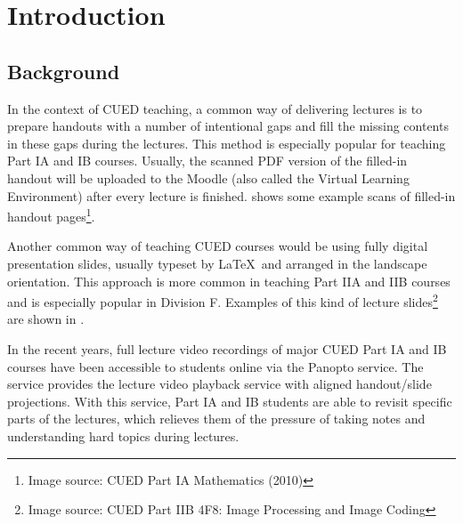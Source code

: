 
\chapter{Introduction}  %

\ifpdf
    \graphicspath{{Chapter1/Figs/Raster/}{Chapter1/Figs/PDF/}{Chapter1/Figs/}}
\else
    \graphicspath{{Chapter1/Figs/Vector/}{Chapter1/Figs/}}
\fi


\section{Background}
\label{sec:intro-background}

In the context of CUED teaching, a common way of delivering lectures is to prepare handouts with a number of intentional gaps and fill the missing contents in these gaps during the lectures. This method is especially popular for teaching Part IA and IB courses. Usually, the scanned PDF version of the filled-in handout will be uploaded to the Moodle (also called the Virtual Learning Environment) after every lecture is finished.  shows some example scans of filled-in handout pages\footnote{Image source: CUED Part IA Mathematics (2010)}.

Another common way of teaching CUED courses would be using fully digital presentation slides, usually typeset by \LaTeX ~and arranged in the landscape orientation. This approach is more common in teaching Part IIA and IIB courses and is especially popular in Division F. Examples of this kind of lecture slides\footnote{Image source: CUED Part IIB 4F8: Image Processing and Image Coding} are shown in .

In the recent years, full lecture video recordings of major CUED Part IA and IB courses have been accessible to students online via the Panopto service. The service provides the lecture video playback service with aligned handout/slide projections. With this service, Part IA and IB students are able to revisit specific parts of the lectures, which relieves them of the pressure of taking notes and understanding hard topics during lectures.

